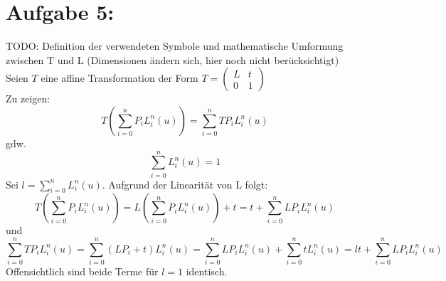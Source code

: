 \section*{Aufgabe 5: }
TODO: Definition der verwendeten Symbole und mathematische Umformung zwischen T und L (Dimensionen ändern sich, hier noch nicht berücksichtigt)\\

Seien $T$ eine affine Transformation der Form $T = \left(\begin{matrix}L & t \\ 0 & 1\end{matrix}\right)$\\
Zu zeigen:
$$
T\left(\sum_{i=0}^{n}P_iL_i^n(u)\right) = \sum_{i=0}^{n}TP_iL_i^n(u)
$$
gdw.
$$
\sum_{i=0}^{n}L_i^n(u) = 1 
$$
Sei $l = \sum_{i=0}^{n}L_i^n(u)$. Aufgrund der Linearität von L folgt:
$$
T\left(\sum_{i=0}^{n}P_iL_i^n(u)\right) = L\left(\sum_{i=0}^{n}P_iL_i^n(u)\right) + t = t + \sum_{i=0}^{n}LP_iL_i^n(u)
$$
und
$$
\sum_{i=0}^{n}TP_iL_i^n(u) = \sum_{i=0}^{n}(LP_i + t)L_i^n(u) = \sum_{i=0}^{n}LP_iL_i^n(u) + \sum_{i=0}^{n}tL_i^n(u) = lt + \sum_{i=0}^{n}LP_iL_i^n(u)
$$
Offensichtlich sind beide Terme für $l = 1$ identisch.